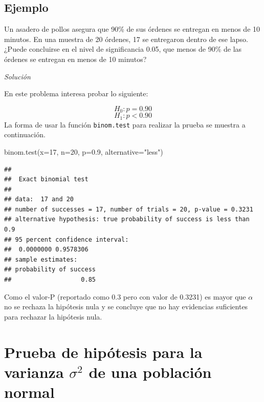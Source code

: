 \documentclass[
]{book}
\makeatletter
\newenvironment{Shaded}{\begin{snugshade}}{\end{snugshade}}
\newcommand{\AttributeTok}[1]{\textcolor[rgb]{0.77,0.63,0.00}{#1}}
\newcommand{\DecValTok}[1]{\textcolor[rgb]{0.00,0.00,0.81}{#1}}
\newcommand{\FloatTok}[1]{\textcolor[rgb]{0.00,0.00,0.81}{#1}}
\newcommand{\FunctionTok}[1]{\textcolor[rgb]{0.00,0.00,0.00}{#1}}
\newcommand{\NormalTok}[1]{#1}
\newcommand{\StringTok}[1]{\textcolor[rgb]{0.31,0.60,0.02}{#1}}
\newenvironment{kframe}{%
\medskip{}
\setlength{\fboxsep}{.8em}
 \def\at@end@of@kframe{}%
 \ifinner\ifhmode%
  \def\at@end@of@kframe{\end{minipage}}%
  \begin{minipage}{\columnwidth}%
 \fi\fi%
 \def\FrameCommand##1{\hskip\@totalleftmargin \hskip-\fboxsep
 \colorbox{shadecolor}{##1}\hskip-\fboxsep
     \hskip-\linewidth \hskip-\@totalleftmargin \hskip\columnwidth}%
 \MakeFramed {\advance\hsize-\width
   \@totalleftmargin\z@ \linewidth\hsize
   \@setminipage}}%
 {\par\unskip\endMakeFramed%
 \at@end@of@kframe}
\renewenvironment{Shaded}{\begin{kframe}}{\end{kframe}}
\makeatother
\begin{document}
\hypertarget{ejemplo-67}{%
\subsection*{Ejemplo}\label{ejemplo-67}}

Un asadero de pollos asegura que 90\% de sus órdenes se entregan en menos de 10 minutos. En una muestra de 20 órdenes, 17 se entregaron dentro de ese lapso. ¿Puede concluirse en el nivel de significancia 0.05, que menos de 90\% de las órdenes se entregan en menos de 10 minutos?

\emph{Solución}

En este problema interesa probar lo siguiente:

\[H_0: p = 0.90\]
\[H_1: p < 0.90\]
La forma de usar la función \texttt{binom.test} para realizar la prueba se muestra a continuación.

\begin{Shaded}
\begin{Highlighting}[]
\FunctionTok{binom.test}\NormalTok{(}\AttributeTok{x=}\DecValTok{17}\NormalTok{, }\AttributeTok{n=}\DecValTok{20}\NormalTok{, }\AttributeTok{p=}\FloatTok{0.9}\NormalTok{, }\AttributeTok{alternative=}\StringTok{"less"}\NormalTok{)}
\end{Highlighting}
\end{Shaded}

\begin{verbatim}
## 
##  Exact binomial test
## 
## data:  17 and 20
## number of successes = 17, number of trials = 20, p-value = 0.3231
## alternative hypothesis: true probability of success is less than 0.9
## 95 percent confidence interval:
##  0.0000000 0.9578306
## sample estimates:
## probability of success 
##                   0.85
\end{verbatim}

Como el valor-P (reportado como 0.3 pero con valor de 0.3231) es mayor que \(\alpha\) no se rechaza la hipótesis nula y se concluye que no hay evidencias suficientes para rechazar la hipótesis nula.

\hypertarget{prueba-de-hipuxf3tesis-para-la-varianza-sigma2-de-una-poblaciuxf3n-normal}{%
\section{\texorpdfstring{Prueba de hipótesis para la varianza \(\sigma^2\) de una población normal}{Prueba de hipótesis para la varianza \textbackslash sigma\^{}2 de una población normal}}\label{prueba-de-hipuxf3tesis-para-la-varianza-sigma2-de-una-poblaciuxf3n-normal}}
\end{document}

